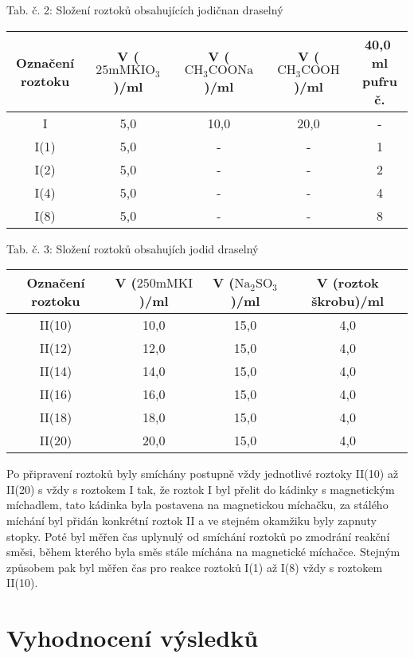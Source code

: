 \documentclass[12pt,a4paper]{article}
\def\ri#1{\mathrm{#1}}
\def\jd#1{\ifmmode\,\mathrm{#1}\else\,\textrm{#1}\fi}
\begin{document}
\begin{center}
	\noindent Tab. č. 2: Složení roztoků obsahujících jodičnan draselný\\
	\begin{tabular}{c|c|c|c|c}
		Označení roztoku & V ($25\ri{mM} \ri{KIO_3}$)/ml & V ($\ri{CH_3COONa}$)/ml & V ($\ri{CH_3COOH}$)/ml & 40,0\jd{ml} pufru č.\\
		\hline
		I & 5,0 & 10,0 & 20,0 & -\\
		I(1) & 5,0 & - & - & 1\\
		I(2) & 5,0 & - & - & 2\\
		I(4) & 5,0 & - & - & 4\\
		I(8) & 5,0 & - & - & 8\\
	\end{tabular}
\end{center} 
\begin{center}
	\noindent Tab. č. 3: Složení roztoků obsahujích jodid draselný\\
	\begin{tabular}{c|c|c|c}
		Označení roztoku & V ($250\ri{mM} \ri{KI}$)/ml & V ($\ri{Na_2SO_3}$)/ml & V (roztok škrobu)/ml\\
		\hline
		II(10) & 10,0 & 15,0 & 4,0\\
		II(12) & 12,0 & 15,0 & 4,0\\
		II(14) & 14,0 & 15,0 & 4,0\\
		II(16) & 16,0 & 15,0 & 4,0\\
		II(18) & 18,0 & 15,0 & 4,0\\
		II(20) & 20,0 & 15,0 & 4,0\\
	\end{tabular}
\end{center}
Po připravení roztoků byly smíchány postupně vždy jednotlivé roztoky II(10) až II(20) s vždy s roztokem I tak, že roztok I byl přelit do kádinky s magnetickým míchadlem, tato kádinka byla postavena na magnetickou míchačku, za stálého míchání byl přidán konkrétní roztok II a ve stejném okamžiku byly zapnuty stopky. Poté byl měřen čas uplynulý od smíchání roztoků po zmodrání reakční směsi, během kterého byla směs stále míchána na magnetické míchačce. Stejným způsobem pak byl měřen čas pro reakce roztoků I(1) až I(8) vždy s roztokem II(10).
\section*{Vyhodnocení výsledků}	
\end{document}
